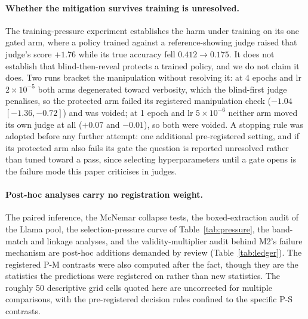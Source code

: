 \documentclass[11pt]{article}
\begin{document}
\paragraph{Whether the mitigation survives training is unresolved.}
The training-pressure experiment establishes the harm under training on its one gated arm, where a policy trained against a reference-showing judge raised that judge's score $+1.76$ while its true accuracy fell $0.412 \to 0.175$.
It does not establish that blind-then-reveal protects a trained policy, and we do not claim it does.
Two runs bracket the manipulation without resolving it: at 4 epochs and lr $2\times10^{-5}$ both arms degenerated toward verbosity, which the blind-first judge penalises, so the protected arm failed its registered manipulation check ($-1.04$ $[-1.36,-0.72]$) and was voided; at 1 epoch and lr $5\times10^{-6}$ neither arm moved its own judge at all ($+0.07$ and $-0.01$), so both were voided.
A stopping rule was adopted before any further attempt: one additional pre-registered setting, and if its protected arm also fails its gate the question is reported unresolved rather than tuned toward a pass, since selecting hyperparameters until a gate opens is the failure mode this paper criticises in judges.

\paragraph{Post-hoc analyses carry no registration weight.}
The paired inference, the McNemar collapse tests, the boxed-extraction audit of the Llama pool, the selection-pressure curve of Table~\ref{tab:pressure}, the band-match and linkage analyses, and the validity-multiplier audit behind M2's failure mechanism are post-hoc additions demanded by review (Table~\ref{tab:ledger}).
The registered P-M contrasts were also computed after the fact, though they are the statistics the predictions were registered on rather than new statistics.
The roughly 50 descriptive grid cells quoted here are uncorrected for multiple comparisons, with the pre-registered decision rules confined to the specific P-S contrasts.
\end{document}
